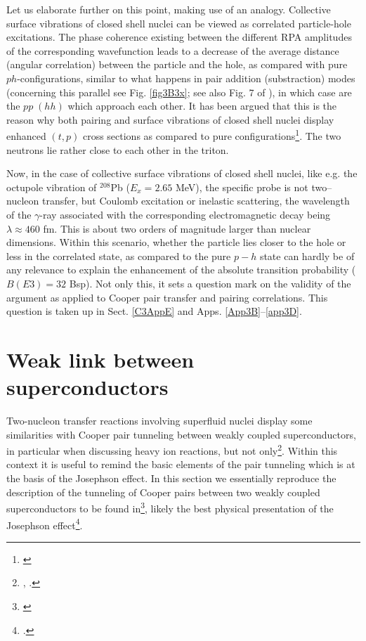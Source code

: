  Let us  elaborate further on this point, making use of an analogy. Collective surface vibrations of closed shell nuclei can be viewed as correlated particle-hole excitations. The phase coherence existing between the different RPA amplitudes of the corresponding wavefunction leads to a decrease of the average distance (angular correlation) between the particle and the hole, as compared with pure $ph$-configurations, similar to what happens in pair addition (substraction) modes (concerning this parallel see Fig. \ref{fig3B3x}; see also Fig. 7 of \cite{Barranco:19b}),  in which case are the $pp\;(hh)$ which approach each other. It has been argued that this is the reason why both pairing and surface vibrations of closed shell nuclei display enhanced $(t,p)$ cross sections as compared to pure configurations\footnote{\cite{Bertsch:67}}. The two neutrons lie rather close to each other in the triton.


Now, in the case of collective surface vibrations of closed shell nuclei, like e.g. the octupole vibration of $^{208}$Pb ($E_x=2.65$ MeV), the specific probe is not two--nucleon transfer, but Coulomb excitation or inelastic scattering,  the wavelength of the $\gamma$-ray associated with the corresponding electromagnetic decay being $\lambda\approx 460$ fm. This is about two orders of magnitude larger than nuclear dimensions. Within this scenario, whether  the particle lies closer to the hole or less in the correlated state, as compared to the pure $p-h$ state can hardly be of any relevance to explain  the enhancement of the absolute transition probability ($B(E3)=32$ Bsp). Not only this, it sets a question mark on the validity of the argument as applied to Cooper pair transfer and pairing correlations. This question is taken up in Sect.  
\ref{C3AppE} and Apps. \ref{App3B}--\ref{app3D}.








\section{Weak link between superconductors}\label{C3AppC}
Two-nucleon transfer reactions involving superfluid nuclei display some similarities with Cooper pair tunneling between weakly coupled superconductors, in particular when discussing heavy ion reactions, but not only\footnote{\cite{Dietrich:71}, \cite{vonOertzen:01,Oertzen:13,Broglia:04a}.}. Within this context it is useful to remind the basic elements of the pair tunneling which is at the basis of the Josephson effect. 
In this section we essentially reproduce the description of the tunneling of Cooper pairs between two weakly coupled superconductors to be found in\footnote{\cite{Anderson:64b}}, likely the best physical presentation of the Josephson effect\footnote{\cite{Josephson:62}.}.


